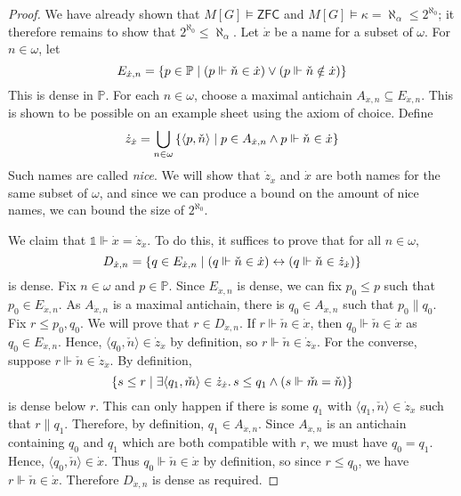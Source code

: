\begin{proof}
    We have already shown that \( M[G] \vDash \mathsf{ZFC} \) and \( M[G] \vDash \kappa = \aleph_\alpha \leq 2^{\aleph_0} \); it therefore remains to show that \( 2^{\aleph_0} \leq \aleph_\alpha \).
    Let \( \dot x \) be a name for a subset of \( \omega \).
    For \( n \in \omega \), let
    \[ E_{\dot x, n} = \qty{p \in \mathbb P \mid (p \Vdash \check n \in \dot x) \vee (p \Vdash \check n \notin \dot x)} \]
    This is dense in \( \mathbb P \).
    For each \( n \in \omega \), choose a maximal antichain \( A_{\dot x, n} \subseteq E_{\dot x, n} \).
    This is shown to be possible on an example sheet using the axiom of choice.
    Define
    \[ \dot z_{\dot x} = \bigcup_{n \in \omega} \qty{\langle p, \check n \rangle \mid p \in A_{\dot x, n} \wedge p \Vdash \check n \in \dot x} \]
    Such names are called \emph{nice}.
    We will show that \( \dot z_{\dot x} \) and \( \dot x \) are both names for the same subset of \( \omega \), and since we can produce a bound on the amount of nice names, we can bound the size of \( 2^{\aleph_0} \).

    We claim that \( \Bbbone \Vdash \dot x = \dot z_{\dot x} \).
    To do this, it suffices to prove that for all \( n \in \omega \),
    \[ D_{\dot x, n} = \qty{q \in E_{\dot x, n} \mid (q \Vdash \check n \in \dot x) \leftrightarrow (q \Vdash \check n \in \dot z_{\dot x})} \]
    is dense.
    Fix \( n \in \omega \) and \( p \in \mathbb P \).
    Since \( E_{\dot x, n} \) is dense, we can fix \( p_0 \leq p \) such that \( p_0 \in E_{\dot x, n} \).
    As \( A_{\dot x, n} \) is a maximal antichain, there is \( q_0 \in A_{\dot x, n} \) such that \( p_0 \mathrel\| q_0 \).
    Fix \( r \leq p_0, q_0 \).
    We will prove that \( r \in D_{\dot x, n} \).
    If \( r \Vdash \check n \in \dot x \), then \( q_0 \Vdash \check n \in \dot x \) as \( q_0 \in E_{\dot x, n} \).
    Hence, \( \langle q_0, \check n \rangle \in \dot z_{\dot x} \) by definition, so \( r \Vdash \check n \in \dot z_{\dot x} \).
    For the converse, suppose \( r \Vdash \check n \in \dot z_{\dot x} \).
    By definition,
    \[ \qty{s \leq r \mid \exists \langle q_1, \check m \rangle \in \dot z_{\dot x}.\, s \leq q_1 \wedge (s \Vdash \check m = \check n)} \]
    is dense below \( r \).
    This can only happen if there is some \( q_1 \) with \( \langle q_1, \check n \rangle \in \dot z_{\dot x} \) such that \( r \mathrel\| q_1 \).
    Therefore, by definition, \( q_1 \in A_{\dot x, n} \).
    Since \( A_{\dot x, n} \) is an antichain containing \( q_0 \) and \( q_1 \) which are both compatible with \( r \), we must have \( q_0 = q_1 \).
    Hence, \( \langle q_0, \check n \rangle \in \dot x \).
    Thus \( q_0 \Vdash \check n \in \dot x \) by definition, so since \( r \leq q_0 \), we have \( r \Vdash \check n \in \dot x \).
    Therefore \( D_{\dot x, n} \) is dense as required.


\end{proof}
